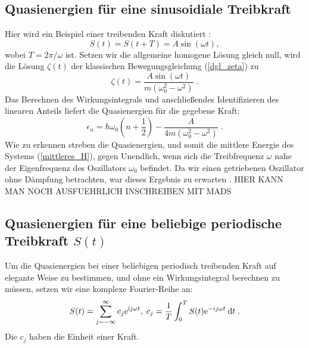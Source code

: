   \subsection{Quasienergien für eine sinusoidiale Treibkraft}
    Hier wird ein Beispiel einer treibenden Kraft diskutiert \cite{haenggi}:
    \begin{equation}
      S(t) = S(t+T) = A\sin(\omega t),
    \end{equation}
    wobei $T=2\pi / \omega$ ist.
    Setzen wir die allgemeine homogene Lösung gleich null, wird die Lösung $\zeta(t)$ der klassischen Bewegungsgleichung (\ref{dgl_zeta}) zu \cite{mads}
    \begin{equation}
      \zeta(t) = \frac{A\sin(\omega t)}{m(\omega_0^2 - \omega^2)} \; .
    \end{equation}
    Das Berechnen des Wirkungsintegrals und anschließendes Identifizieren des linearen Anteils liefert die Quasienergien für die gegebene Kraft:
    \begin{equation}
      \epsilon_n  = \hbar \omega_0\left(n+\frac{1}{2}\right) - \frac{A}{4m(\omega_0^2-\omega^2)} \;.
    \end{equation}
    Wie zu erkennen streben die Quasienergien, und somit die mittlere Energie des Systems (\ref{mittleres_H}), gegen Unendlich, wenn sich die Treibfrequenz $\omega$ nahe der Eigenfrequenz des Oszillators $\omega_0 $ befindet.
    Da wir einen getriebenen Oszillator ohne Dämpfung betrachten, war dieses Ergebnis zu erwarten \cite{mads}.
    HIER KANN MAN NOCH AUSFUEHRLICH INSCHREIBEN MIT MADS


\subsection{Quasienergien für eine beliebige periodische Treibkraft $S(t)$}
  Um die Quasienergien bei einer beliebigen periodisch treibenden Kraft auf elegante Weise zu bestimmen, und ohne ein Wirkungsintegral berechnen zu müssen, setzen wir eine komplexe Fourier-Reihe an:
  \begin{equation}
    S(t) = \sum_{j=-\infty}^\infty c_j \text e^{\text ij\omega t}, \; c_j = \frac{1}{T} \int_0^T S(t) \text e^{-ij\omega t} \: \text d t \; .
  \end{equation}
  Die $c_j$ haben die Einheit einer Kraft.


